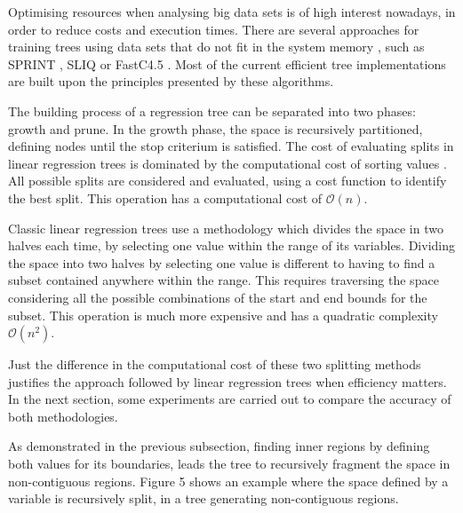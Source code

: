 \documentclass[times,twocolumn,final,authoryear]{elsarticle}
\begin{document}
Optimising resources when analysing big data sets is of high interest nowadays, in order to reduce costs and execution times. There are several approaches for training trees using data sets that do not fit in the system memory \citep{Rokach2016}, such as SPRINT \citep{Shareretal1996}, SLIQ \citep{Mehtaetal1996} or FastC4.5 \citep{Heetal2007}. Most of the current efficient tree implementations are built upon the principles presented by these algorithms.

The building process of a regression tree can be separated into two phases: growth and prune. In the growth phase, the space is recursively partitioned, defining nodes until the stop criterium is satisfied. The cost of evaluating splits in linear regression trees is dominated by the computational cost of sorting values \citep{Shareretal1996}. All possible splits are considered and evaluated, using a cost function to identify the best split. This operation has a computational cost of $\mathcal{O}(n)$.

Classic linear regression trees use a methodology which divides the space in two halves each time, by selecting one value within the range of its variables. Dividing the space into two halves by selecting one value is different to having to find a subset contained anywhere within the range. This requires traversing the space considering all the possible combinations of the start and end bounds for the subset. This operation is much more expensive and has a quadratic complexity $\mathcal{O}(n^2)$.

Just the difference in the computational cost of these two splitting methods justifies the approach followed by linear regression trees when efficiency matters. In the next section, some experiments are carried out to compare the accuracy of both methodologies.

As demonstrated in the previous subsection, finding inner regions by defining both values for its boundaries, leads the tree to recursively fragment the space in non-contiguous regions. Figure 5 shows an example where the space defined by a variable is recursively split, in a tree generating non-contiguous regions.

%
%
\end{document}
